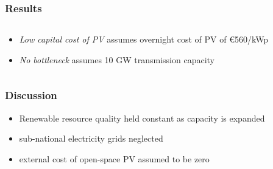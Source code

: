 \documentclass[aspectratio=1610, xcolor=dvipsnames]{beamer}
\begin{document}
    \begin{frame}
        \frametitle{Results}

        \begin{columns}[T]
            \begin{column}{5.4 cm}
                \bigskip
                \begin{itemize}
                    \item \emph{Low capital cost of PV} assumes overnight cost of PV of \euro 560/kWp
                    \item \emph{No bottleneck} assumes 10 GW transmission capacity
                \end{itemize}
            \end{column}
        \end{columns}
    \end{frame}


    \begin{frame}
        \frametitle{Discussion}
        \begin{itemize}
            \item Renewable resource quality held constant as capacity is expanded
            \item sub-national electricity grids neglected
            \item external cost of open-space PV assumed to be zero
        \end{itemize}
    \end{frame}
\end{document}

